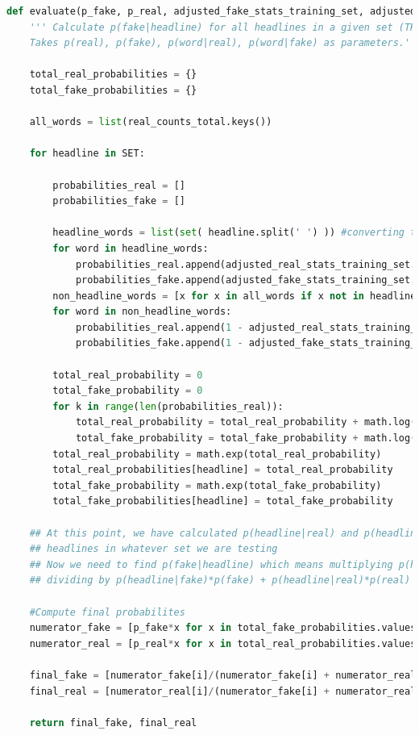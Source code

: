 \documentclass{article}
\begin{document}
\begin{lstlisting}[language=Python]
def evaluate(p_fake, p_real, adjusted_fake_stats_training_set, adjusted_real_stats_training_set, SET):
    ''' Calculate p(fake|headline) for all headlines in a given set (TRAINING, TEST, VALIDATION).
    Takes p(real), p(fake), p(word|real), p(word|fake) as parameters.'''

    total_real_probabilities = {}
    total_fake_probabilities = {}
    
    all_words = list(real_counts_total.keys())
    
    for headline in SET:
         
        probabilities_real = []
        probabilities_fake = []
        
        headline_words = list(set( headline.split(' ') )) #converting to set and back to a list removes duplicates
        for word in headline_words:
            probabilities_real.append(adjusted_real_stats_training_set.get(word))
            probabilities_fake.append(adjusted_fake_stats_training_set.get(word))
        non_headline_words = [x for x in all_words if x not in headline_words]
        for word in non_headline_words:
            probabilities_real.append(1 - adjusted_real_stats_training_set.get(word))
            probabilities_fake.append(1 - adjusted_fake_stats_training_set.get(word))
        
        total_real_probability = 0
        total_fake_probability = 0
        for k in range(len(probabilities_real)):
            total_real_probability = total_real_probability + math.log(probabilities_real[k])
            total_fake_probability = total_fake_probability + math.log(probabilities_fake[k])
        total_real_probability = math.exp(total_real_probability)
        total_real_probabilities[headline] = total_real_probability
        total_fake_probability = math.exp(total_fake_probability)
        total_fake_probabilities[headline] = total_fake_probability

    ## At this point, we have calculated p(headline|real) and p(headline|fake) for all
    ## headlines in whatever set we are testing
    ## Now we need to find p(fake|headline) which means multiplying p(headline|fake) by p(fake) and 
    ## dividing by p(headline|fake)*p(fake) + p(headline|real)*p(real) 

    #Compute final probabilites
    numerator_fake = [p_fake*x for x in total_fake_probabilities.values()]
    numerator_real = [p_real*x for x in total_real_probabilities.values()]
    
    final_fake = [numerator_fake[i]/(numerator_fake[i] + numerator_real[i]) for i in range(len(numerator_fake))]
    final_real = [numerator_real[i]/(numerator_fake[i] + numerator_real[i]) for i in range(len(numerator_real))]

    return final_fake, final_real
  \end{lstlisting}
\end{document}
